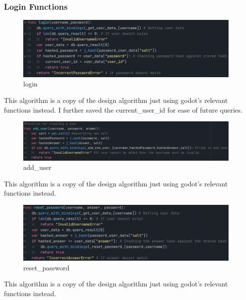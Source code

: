\documentclass{article}
\begin{document}
        \subsubsection{Login Functions}
        \begin{figure}[H]
                \centering
                \includegraphics[width = \columnwidth]{images/development/login.PNG}
                \caption{login}
        \end{figure}
        This algorithm is a copy of the design algorithm just using godot's relevant functions instead. I further saved the current\_user\_id for ease of future queries.\\
        \begin{figure}[H]
                \centering
                \includegraphics[width = \columnwidth]{images/development/add_user.PNG}
                \caption{add\_user}
        \end{figure}
        This algorithm is a copy of the design algorithm just using godot's relevant functions instead.\\
        \begin{figure}[H]
                \centering
                \includegraphics[width = \columnwidth]{images/development/reset_password.PNG}
                \caption{reset\_password}
        \end{figure}
        This algorithm is a copy of the design algorithm just using godot's relevant functions instead.\\
\end{document}
